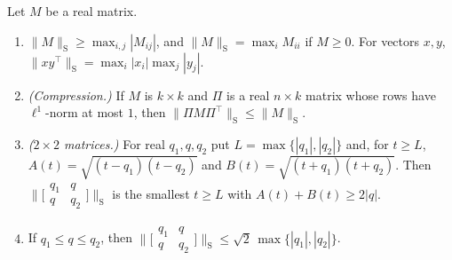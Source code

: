 \begin{lemma}\label{cont:lem:schur}
Let $M$ be a real matrix.
\begin{enumerate}
\item[(a)] $\|M\|_{\mathrm S}\geq\max_{i,j}|M_{ij}|$, and $\|M\|_{\mathrm S}=\max_iM_{ii}$ if $M\geq0$. For vectors $x,y$, $\|xy^\top\|_{\mathrm S}=\max_i|x_i|\max_j|y_j|$.
\item[(b)] \emph{(Compression.)} If $M$ is $k\times k$ and $\Pi$ is a real $n\times k$ matrix whose rows have $\ell^1$-norm at most $1$, then $\|\Pi M\Pi^\top\|_{\mathrm S}\leq\|M\|_{\mathrm S}$.
\item[(c)] \emph{($2\times2$ matrices.)} For real $q_1,q,q_2$ put $L=\max\{|q_1|,|q_2|\}$ and, for $t\geq L$, $A(t)=\sqrt{(t-q_1)(t-q_2)}$ and $B(t)=\sqrt{(t+q_1)(t+q_2)}$. Then $\big\|\big[\begin{smallmatrix}q_1&q\\q&q_2\end{smallmatrix}\big]\big\|_{\mathrm S}$ is the smallest $t\geq L$ with $A(t)+B(t)\geq2|q|$.
\item[(d)] If $q_1\leq q\leq q_2$, then $\big\|\big[\begin{smallmatrix}q_1&q\\q&q_2\end{smallmatrix}\big]\big\|_{\mathrm S}\leq\sqrt2\,\max\{|q_1|,|q_2|\}$.
\end{enumerate}
\end{lemma}
 
